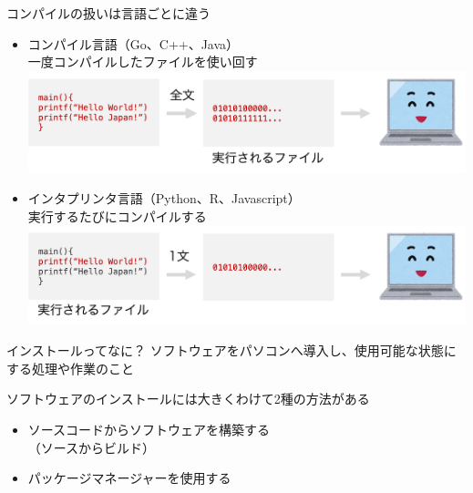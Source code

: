 \documentclass[
  ignorenonframetext,
]{beamer}
\providecommand{\tightlist}{%
  \setlength{\itemsep}{0pt}\setlength{\parskip}{0pt}}\usepackage{longtable,booktabs,array}
\begin{document}
\begin{frame}{コンパイルの扱いは言語ごとに違う}
\protect\hypertarget{ux30b3ux30f3ux30d1ux30a4ux30ebux306eux6271ux3044ux306fux8a00ux8a9eux3054ux3068ux306bux9055ux3046}{}
\begin{itemize}[<+->]
\item
  コンパイル言語（Go、C++、Java）\\
  一度コンパイルしたファイルを使い回す
  \includegraphics[width=9.375in,height=\textheight]{image/compile_language.png}
\item
  インタプリンタ言語（Python、R、Javascript）\\
  実行するたびにコンパイルする
  \includegraphics[width=9.375in,height=\textheight]{image/interprinter.png}
\end{itemize}
\end{frame}

\begin{frame}{インストールってなに？}
\protect\hypertarget{ux30a4ux30f3ux30b9ux30c8ux30fcux30ebux3063ux3066ux306aux306b}{}
ソフトウェアをパソコンへ導入し、使用可能な状態にする処理や作業のこと

ソフトウェアのインストールには大きくわけて2種の方法がある

\begin{itemize}[<+->]
\tightlist
\item
  ソースコードからソフトウェアを構築する\\
  （ソースからビルド）
\item
  パッケージマネージャーを使用する
\end{itemize}
\end{frame}
\end{document}
